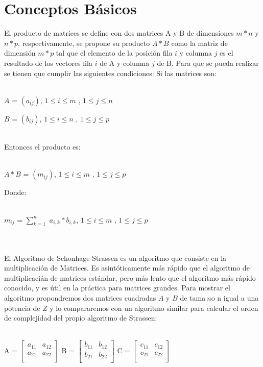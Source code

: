 \documentclass[12pt,twoside]{article}
\begin{document}
\section{Conceptos B\'asicos}
El producto de matrices se define con dos matrices A y B de dimensiones $m*n$ y $n*p$, respectivamente, se propone su producto $A*B$ como la matriz de dimensi\'on $m*p$ tal que el elemento de la posici\'on fila $i$ y columna $j$ es el resultado de los vectores fila $i$ de A y columna $j$ de B. Para que se pueda realizar se tienen que cumplir las siguientes condiciones:\newpage
Si las matrices son:\\\\
\centerline{$A$ = $(a_{ij})$, $1 \leq i \leq m$ , $1 \leq j \leq n$}
\centerline{$B$ = $(b_{ij})$, $1 \leq i \leq n$ , $1 \leq j \leq p$}\\
Entonces el producto es:\\\\
\centerline{$A*B$ = $(m_{ij})$, $1 \leq i \leq m$ , $1 \leq j \leq p$}
Donde:\\\\
\centerline{$m_{ij}$ = $\sum_{k=1}^{n}$ $a_{i,k}*b_{i,k}$, $1 \leq i \leq m$ , $1 \leq j \leq p$}\\\\
El Algoritmo de Schonhage-Strassen es un algoritmo que consiste en la multiplicaci\'on de Matrices. Es asint\'oticamente m\'as r\'apido que el algoritmo de multiplicaci\'an de matrices est\'andar, pero m\'as lento que el algoritmo m\'as r\'apido conocido, y es \'util en la pr\'actica para matrices grandes. Para mostrar el algoritmo propondremos dos matrices cuadradas $A$ y $B$ de tama$~n$o n igual a una potencia de $Z$ y lo compararemos con un algoritmo similar para calcular el orden de complejidad del propio algoritmo de Strassen:\\\\
\centerline{
A = 
$
\begin{bmatrix}
    a_{11}  & a_{12}\\
    a_{21} & a_{22}\\
\end{bmatrix}
$
B = 
$
\begin{bmatrix}
    b_{11}  & b_{12}\\
    b_{21} & b_{22}\\
\end{bmatrix}
$
C = 
$
\begin{bmatrix}
    c_{11}  & c_{12}\\
    c_{21} & c_{22}\\
\end{bmatrix}
$}\\\\
\end{document}
